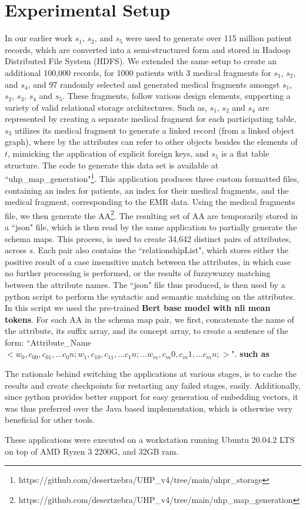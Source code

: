 
\section*{Experimental Setup}
\label{experimentalSetup}
In our earlier work \cite{Satti2020} $s_1$, $s_2$, and $s_5$ were used to generate over 115 million patient records, which are converted into a semi-structured form and stored in Hadoop Distributed File System (HDFS). We extended the same setup to create an additional 100,000 records, for 1000 patients with 3 medical fragments for $s_1$, $s_2$, and $s_4$, and 97 randomly selected and generated medical fragments amongst $s_1$, $s_2$, $s_3$, $s_4$ and $s_5$. These fragments, follow various design elements, supporting a variety of valid relational storage architectures. Such as, $s_1$, $s_2$ and $s_4$ are represented by creating a separate medical fragment for each participating table, $s_3$ utilizes its medical fragment to generate a linked record (from a linked object graph), where by the attributes can refer to other objects besides the elements of $t$, mimicking the application of explicit foreign keys, and $s_5$ is a flat table structure. The code to generate this data set is available at ``uhp\_map\_generation"\footnote{https://github.com/desertzebra/UHP\_v4/tree/main/uhpr\_storage}. This application produces three custom formatted files, containing an index for patients, an index for their medical fragments, and the medical fragment, corresponding to the EMR data. Using the medical fragments file, we then generate the AA\footnote{https://github.com/desertzebra/UHP\_v4/tree/main/uhp\_map\_generation}. The resulting set of AA are temporarily stored in a ``json" file, which is then read by the same application to partially generate the schema maps. This process, is used to create 34,642 distinct pairs of attributes, across $s$. Each pair also contains the ``relationshipList", which stores either the positive result of a case insensitive match between the attributes, in which case no further processing is performed, or the results of fuzzywuzzy matching between the attribute names. 
The ``json" file thus produced, is then used by a python script to perform the syntactic and semantic matching on the attributes. In this script we used the pre-trained \textbf{Bert base model with nli mean tokens}. For each AA in the schema map pair, we first, concatenate the name of the attribute, its suffix array, and its concept array, to create a sentence of the form:
``Attribute\_Name $< w_0,c_00,c_01,...c_0n; w_1,c_10,c_11,...c_1n;...w_m,c_m0,c_m1,...c_mn;>$". \textbf{such as}

The rationale behind switching the applications at various stages, is to cache the results and create checkpoints for restarting any failed stages, easily. Additionally, since python provides better support for easy generation of embedding vectors, it was thus preferred over the Java based implementation, which is otherwise very beneficial for other tools.

These applications were executed on a workstation running Ubuntu 20.04.2 LTS on top of AMD Ryzen 3 2200G, and 32GB ram.



